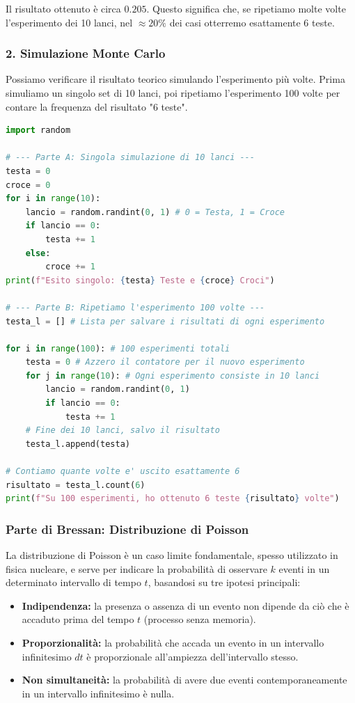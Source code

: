 \documentclass{article}
\theoremstyle{remark}
\newcommand{\ripasso}[1]{
    \subsubsection{\texorpdfstring{\color{red}Parte di Bressan: #1}{Parte di Bressan: #1}}
}
\begin{document}
Il risultato ottenuto è circa $0.205$. Questo significa che, se ripetiamo molte volte l'esperimento dei 10 lanci, nel $\approx 20\%$ dei casi otterremo esattamente 6 teste.

\subsubsection*{2. Simulazione Monte Carlo}
Possiamo verificare il risultato teorico simulando l'esperimento più volte.
Prima simuliamo un singolo set di 10 lanci, poi ripetiamo l'esperimento 100 volte per contare la frequenza del risultato "6 teste".

\begin{lstlisting}[language=Python, frame=single, caption=Simulazione dei lanci]
import random

# --- Parte A: Singola simulazione di 10 lanci ---
testa = 0
croce = 0
for i in range(10):
    lancio = random.randint(0, 1) # 0 = Testa, 1 = Croce
    if lancio == 0:
        testa += 1
    else:
        croce += 1
print(f"Esito singolo: {testa} Teste e {croce} Croci")

# --- Parte B: Ripetiamo l'esperimento 100 volte ---
testa_l = [] # Lista per salvare i risultati di ogni esperimento

for i in range(100): # 100 esperimenti totali
    testa = 0 # Azzero il contatore per il nuovo esperimento
    for j in range(10): # Ogni esperimento consiste in 10 lanci
        lancio = random.randint(0, 1)
        if lancio == 0:
            testa += 1
    # Fine dei 10 lanci, salvo il risultato
    testa_l.append(testa)

# Contiamo quante volte e' uscito esattamente 6
risultato = testa_l.count(6)
print(f"Su 100 esperimenti, ho ottenuto 6 teste {risultato} volte")
\end{lstlisting}





\ripasso{Distribuzione di Poisson}
La distribuzione di Poisson è un caso limite fondamentale, spesso utilizzato in fisica nucleare, e serve per indicare la probabilità di osservare $k$ eventi in un determinato intervallo di tempo $t$, basandosi su tre ipotesi principali:
\begin{itemize}
    \item \textbf{Indipendenza:} la presenza o assenza di un evento non dipende da ciò che è accaduto prima del tempo $t$ (processo senza memoria).
    \item \textbf{Proporzionalità:} la probabilità che accada un evento in un intervallo infinitesimo $dt$ è proporzionale all'ampiezza dell'intervallo stesso.
    \item \textbf{Non simultaneità:} la probabilità di avere due eventi contemporaneamente in un intervallo infinitesimo è nulla.
\end{itemize}
\end{document}
